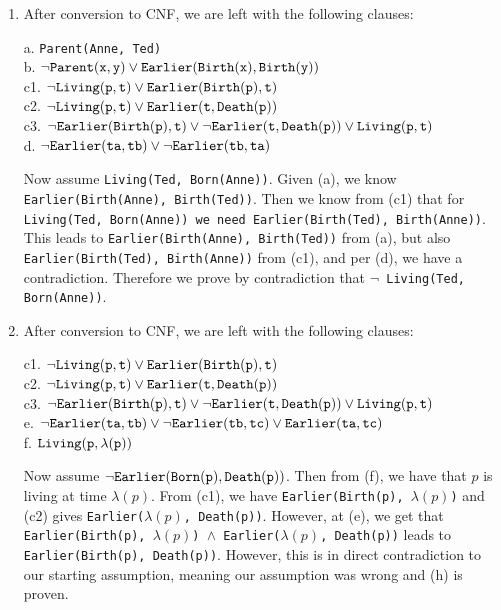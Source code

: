 \documentclass{article}
\begin{document}
\begin{enumerate}
\begin{enumerate}
			\end{enumerate}
		
		\item After conversion to CNF, we are left with the following clauses:
		
		a.\phantom{1} {\tt Parent(Anne, Ted)}\\
		b.\phantom{1} ${\tt \neg Parent(x,y) \vee Earlier(Birth(x), Birth(y))}$\\
		c1. ${\tt \neg Living(p,t) \vee Earlier(Birth(p), t)}$\\
		c2. ${\tt \neg Living(p,t) \vee Earlier(t, Death(p))}$\\
		c3. ${\tt \neg Earlier(Birth(p),t) \vee \neg Earlier(t, Death(p)) \vee Living(p,t)}$\\
		d.\phantom{1} ${\tt \neg Earlier(ta, tb) \vee \neg Earlier(tb, ta)}$
		
		Now assume {\tt Living(Ted, Born(Anne))}.  Given (a), we know {\tt Earlier(Birth(Anne), Birth(Ted))}.  Then we know from (c1) that for {\tt Living(Ted, Born(Anne)) we need Earlier(Birth(Ted), Birth(Anne))}.\\  This leads to {\tt Earlier(Birth(Anne), Birth(Ted))} from (a), but also {\tt Earlier(Birth(Ted), Birth(Anne))} from (c1), and per (d), we have a contradiction.  Therefore we prove by contradiction that {\tt $\neg$ Living(Ted, Born(Anne))}.
		
		\item After conversion to CNF, we are left with the following clauses:
		
		c1. ${\tt \neg Living(p,t) \vee Earlier(Birth(p), t)}$\\
		c2. ${\tt \neg Living(p,t) \vee Earlier(t, Death(p))}$\\
		c3. ${\tt \neg Earlier(Birth(p),t) \vee \neg Earlier(t, Death(p)) \vee Living(p,t)}$\\
		e.\phantom{1} ${\tt \neg Earlier(ta, tb) \vee \neg Earlier(tb, tc) \vee Earlier(ta, tc)}$\\
		f.\phantom{1} ${\tt Living(p, \lambda(p))}$
		
		Now assume ${\tt \neg Earlier(Born(p), Death(p))}$.  Then from (f), we have that $p$ is living at time $\lambda(p)$.  From (c1), we have {\tt Earlier(Birth(p), $\lambda(p)$)} and (c2) gives {\tt Earlier($\lambda(p)$, Death(p))}.  However, at (e), we get that {\tt Earlier(Birth(p), $\lambda(p)$) $\wedge$ Earlier($\lambda(p)$, Death(p))} leads to {\tt Earlier(Birth(p), Death(p))}.  However, this is in direct contradiction to our starting assumption, meaning our assumption was wrong and (h) is proven.
		 
	\end{enumerate}
\end{document}
